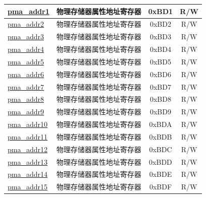 \begin{longtable}{ | p{4.0cm} | p{8.4cm} | c | c| }
\hyperref[sec:riscvcpu-pma-reg-desc]{pma\_addr1} & 物理存储器属性地址寄存器 & 0xBD1 & R/W \\\hline
\hyperref[sec:riscvcpu-pma-reg-desc]{pma\_addr2} & 物理存储器属性地址寄存器 & 0xBD2 & R/W \\\hline
\hyperref[sec:riscvcpu-pma-reg-desc]{pma\_addr3} & 物理存储器属性地址寄存器 & 0xBD3 & R/W \\\hline
\hyperref[sec:riscvcpu-pma-reg-desc]{pma\_addr4} & 物理存储器属性地址寄存器 & 0xBD4 & R/W \\\hline
\hyperref[sec:riscvcpu-pma-reg-desc]{pma\_addr5} & 物理存储器属性地址寄存器 & 0xBD5 & R/W \\\hline
\hyperref[sec:riscvcpu-pma-reg-desc]{pma\_addr6} & 物理存储器属性地址寄存器 & 0xBD6 & R/W \\\hline
\hyperref[sec:riscvcpu-pma-reg-desc]{pma\_addr7} & 物理存储器属性地址寄存器 & 0xBD7 & R/W \\\hline
\hyperref[sec:riscvcpu-pma-reg-desc]{pma\_addr8} & 物理存储器属性地址寄存器 & 0xBD8 & R/W \\\hline
\hyperref[sec:riscvcpu-pma-reg-desc]{pma\_addr9} & 物理存储器属性地址寄存器 & 0xBD9 & R/W \\\hline
\hyperref[sec:riscvcpu-pma-reg-desc]{pma\_addr10} & 物理存储器属性地址寄存器 & 0xBDA & R/W \\\hline
\hyperref[sec:riscvcpu-pma-reg-desc]{pma\_addr11} & 物理存储器属性地址寄存器 & 0xBDB & R/W \\\hline
\hyperref[sec:riscvcpu-pma-reg-desc]{pma\_addr12} & 物理存储器属性地址寄存器 & 0xBDC & R/W \\\hline
\hyperref[sec:riscvcpu-pma-reg-desc]{pma\_addr13} & 物理存储器属性地址寄存器 & 0xBDD & R/W \\\hline
\hyperref[sec:riscvcpu-pma-reg-desc]{pma\_addr14} & 物理存储器属性地址寄存器 & 0xBDE & R/W \\\hline
\hyperref[sec:riscvcpu-pma-reg-desc]{pma\_addr15} & 物理存储器属性地址寄存器 & 0xBDF & R/W \\\hline

\end{longtable}
